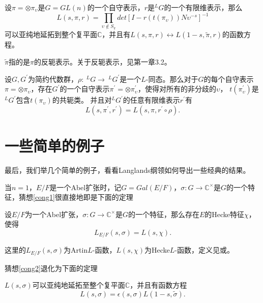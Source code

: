   \begin{conjecture}
  \label{cong2}
  设$\pi = \otimes
  \pi_{\upsilon}$是$G = GL(n)$的一个自守表示，$r$是$^{L}G$的一个有限维表示，那么
  $$L(s,\pi,r) = \prod\limits_{\upsilon\not\in
  S_{\pi}}det[I-r(t(\pi_{\upsilon}))N\upsilon^{-s}]^{-1}$$
  可以亚纯地延拓到整个复平面$\mathbb{C}$，并且有$L(s,\pi,r)\leftrightarrow
  L(1-s,\widetilde{\pi},r)$的函数方程。
  \end{conjecture}

  $\widetilde{\pi}$指的是$\pi$的反轭表示。关于反轭表示，见第一章3.2。

  \begin{conjecture}
  \label{cong3}
  设$G,G^{\prime}$为简约代数群，$\rho: \ ^{L}G\rightarrow
  \ ^{L}G^{\prime}$是一个$L$-同态。那么对于$G$的每个自守表示$\pi =
  \otimes \pi_{\upsilon}$，存在$G^{\prime}$的一个自守表示$\pi^{\prime}
  = \otimes \pi_{\upsilon}^{\prime}$，使得对所有的非分歧的$\upsilon$，
  $t(\pi_{\upsilon}^{\prime})$是$^{L}G^{\prime}$包含$t(\pi_{\upsilon})$的共轭类。
  并且对$^{L}G^{\prime}$的任意有限维表示$r^{\prime}$有
  $$L(s,\pi^{\prime},r^{\prime}) = L(s,\pi,r^{\prime}\circ \rho).$$
  \end{conjecture}

\section{一些简单的例子}
  最后，我们举几个简单的例子，看看Langlands纲领如何导出一些经典的结果。
  \begin{example}
  当$n = 1$，$E/F$是一个Abel扩张时，记$G = Gal(E/F)$，$\sigma:G\rightarrow
  \mathbb{C}^{\times}$是$G$的一个特征，猜想\ref{cong1}很直接地即是下面的定理
  \begin{theorem}[Artin]
  设$E/F$为一个Abel扩张，$\sigma:G\rightarrow
  \mathbb{C}^{\times}$是$G$的一个特征，那么存在$E$的Hecke特征$\chi$，使得
  $$L_{E/F}(s, \sigma) = L(s, \chi).$$
  \end{theorem}

  这里的$L_{E/F}(s, \sigma)$为Artin$L$-函数，$L(s,
  \chi)$为Hecke$L$-函数，定义见或。

  猜想\ref{cong2}退化为下面的定理
  \begin{theorem}
  $L(s,\sigma)$可以亚纯地延拓至整个复平面$\mathbb{C}$，并且有函数方程
  $$L(s,\sigma) = \epsilon(s,\sigma)L(1-s,\widetilde{\sigma}).$$
  \end{theorem}
  \end{example}

